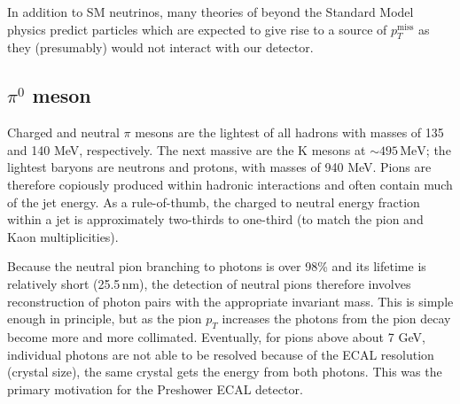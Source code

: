 In addition to SM neutrinos, many theories of beyond the Standard Model physics predict particles which are expected to give rise to a source of $p_{T}^{\mathrm{miss}}$ as they (presumably) would not interact with our detector.

\subsection{$\pi^{0}$ meson}

Charged and neutral $\pi$ mesons are the lightest of all hadrons with masses of 135 and 140 MeV, respectively. The next massive are the K mesons at $\sim495\,\textrm{MeV}$; the lightest baryons are neutrons and protons, with masses of 940 MeV. Pions are therefore copiously produced within hadronic interactions and often contain much of the jet energy. As a rule-of-thumb, the charged to neutral energy fraction within a jet is approximately two-thirds to one-third (to match the pion and Kaon multiplicities).

Because the neutral pion branching to photons is over 98\% and its lifetime is relatively short (25.5$\,$nm), the detection of neutral pions therefore involves reconstruction of photon pairs with the appropriate invariant mass. This is simple enough in principle, but as the pion $p_{T}$ increases the photons from the pion decay become more and more collimated. Eventually, for pions above about 7 GeV, individual photons are not able to be resolved because of the ECAL resolution (crystal size), the same crystal gets the energy from both photons. This was the primary motivation for the Preshower ECAL detector.

